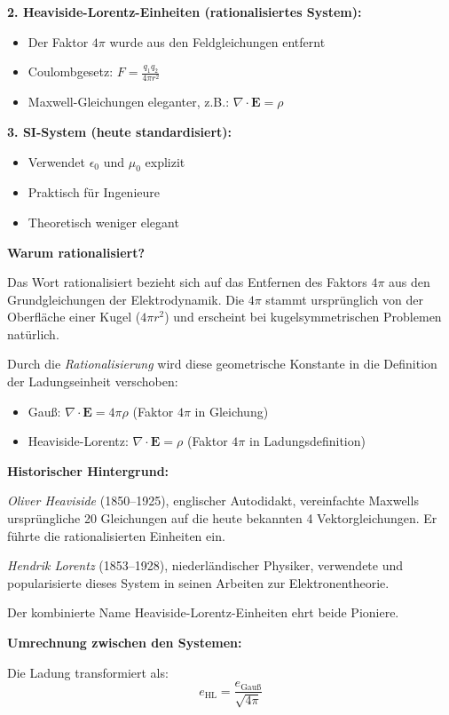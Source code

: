 \textbf{2. Heaviside-Lorentz-Einheiten (rationalisiertes System):}
\begin{itemize}[nosep]
	\item Der Faktor $4\pi$ wurde aus den Feldgleichungen entfernt
	\item Coulombgesetz: $F = \frac{q_1 q_2}{4\pi r^2}$
	\item Maxwell-Gleichungen eleganter, z.B.: $\nabla \cdot \mathbf{E} = \rho$
\end{itemize}

\textbf{3. SI-System (heute standardisiert):}
\begin{itemize}[nosep]
	\item Verwendet $\epsilon_0$ und $\mu_0$ explizit
	\item Praktisch für Ingenieure
	\item Theoretisch weniger elegant
\end{itemize}

\textbf{Warum rationalisiert?}

Das Wort rationalisiert bezieht sich auf das Entfernen des Faktors $4\pi$ aus den Grundgleichungen der Elektrodynamik. Die $4\pi$ stammt ursprünglich von der Oberfläche einer Kugel ($4\pi r^2$) und erscheint bei kugelsymmetrischen Problemen natürlich.

Durch die \textit{Rationalisierung} wird diese geometrische Konstante in die Definition der Ladungseinheit verschoben:
\begin{itemize}[nosep]
	\item Gauß: $\nabla \cdot \mathbf{E} = 4\pi\rho$ (Faktor $4\pi$ in Gleichung)
	\item Heaviside-Lorentz: $\nabla \cdot \mathbf{E} = \rho$ (Faktor $4\pi$ in Ladungsdefinition)
\end{itemize}

\textbf{Historischer Hintergrund:}

\textit{Oliver Heaviside} (1850--1925), englischer Autodidakt, vereinfachte Maxwells ursprüngliche 20 Gleichungen auf die heute bekannten 4 Vektorgleichungen. Er führte die rationalisierten Einheiten ein.

\textit{Hendrik Lorentz} (1853--1928), niederländischer Physiker, verwendete und popularisierte dieses System in seinen Arbeiten zur Elektronentheorie.

Der kombinierte Name Heaviside-Lorentz-Einheiten ehrt beide Pioniere.

\textbf{Umrechnung zwischen den Systemen:}

Die Ladung transformiert als:
\begin{equation}
	e_{\text{HL}} = \frac{e_{\text{Gauß}}}{\sqrt{4\pi}}
\end{equation}


